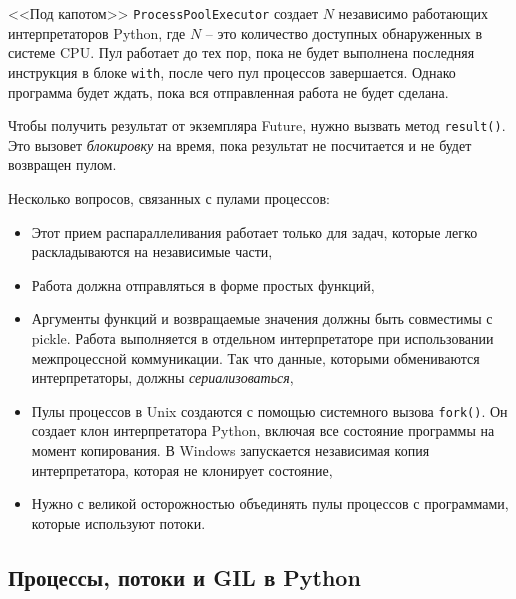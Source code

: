 \documentclass[%
	11pt,
	a4paper,
	utf8,
		]{article}
\begin{document}
<<Под капотом>> \texttt{ProcessPoolExecutor} создает $ N $ независимо работающих интерпретаторов Python, где $ N $ -- это количество доступных обнаруженных в системе CPU. Пул работает до тех пор, пока не будет выполнена последняя инструкция в блоке \texttt{with}, после чего пул процессов завершается. Однако программа будет ждать, пока вся отправленная работа не будет сделана.

Чтобы получить результат от экземпляра Future, нужно вызвать метод \texttt{result()}. Это вызовет \emph{блокировку} на время, пока результат не посчитается и не будет возвращен пулом.

Несколько вопросов, связанных с пулами процессов:
\begin{itemize}
	\item Этот прием распараллеливания работает только для задач, которые легко раскладываются на независимые части,
	
	\item Работа должна отправляться в форме простых функций,
	
	\item Аргументы функций и возвращаемые значения должны быть совместимы с pickle. Работа выполняется в отдельном интерпретаторе при использовании межпроцессной коммуникации. Так что данные, которыми обмениваются интерпретаторы, должны \emph{сериализоваться},
	
	\item Пулы процессов в Unix создаются с помощью системного вызова \texttt{fork()}. Он создает клон интерпретатора Python, включая все состояние программы на момент копирования. В Windows запускается независимая копия интерпретатора, которая не клонирует состояние,
	
	\item Нужно с великой осторожностью объединять пулы процессов с программами, которые используют потоки.
\end{itemize}

\subsection{Процессы, потоки и GIL в Python}
\end{document}
